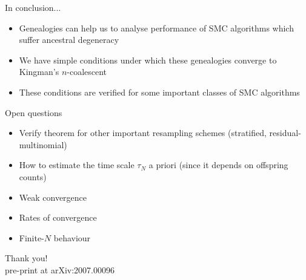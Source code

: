 \documentclass[aspectratio=169]{beamer}
\theoremstyle{definition}
\begin{document}
\begin{frame}{In conclusion...}
\begin{itemize}
\item Genealogies can help us to analyse performance of SMC algorithms which suffer ancestral degeneracy
\item We have simple conditions under which these genealogies converge to Kingman's $n$-coalescent
\item These conditions are verified for some important classes of SMC algorithms
\end{itemize}
\end{frame}

\begin{frame}{Open questions}
\begin{itemize}
\item Verify theorem for other important resampling schemes (stratified, residual-multinomial)
\item How to estimate the time scale $\tau_N$ a priori (since it depends on offspring counts)
\item Weak convergence
\item Rates of convergence
\item Finite-$N$ behaviour
\end{itemize}
\end{frame}

\begin{frame}
\centering
\vspace{1cm}
{\Large Thank you!}\\
\vspace{1cm}
pre-print at arXiv:2007.00096
\end{frame}
\end{document}
